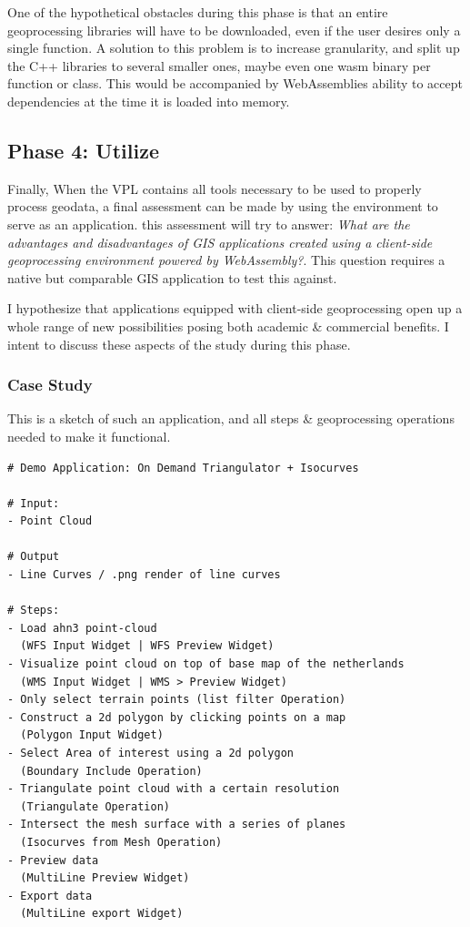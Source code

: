 One of the hypothetical obstacles during this phase is that an entire geoprocessing libraries will have to be downloaded, even if the user desires only a single function. A solution to this problem is to increase granularity, and split up the C++ libraries to several smaller ones, maybe even one wasm binary per function or class. This would be accompanied by WebAssemblies ability to accept dependencies at the time it is loaded into memory. 




\subsection{Phase 4: Utilize}

Finally, When the VPL contains all tools necessary to be used to properly process geodata, a final assessment can be made by using the environment to serve as an application. this assessment will try to answer: \textit{What are the advantages and disadvantages of GIS applications created using a client-side geoprocessing environment powered by WebAssembly?}. This question requires a native but comparable GIS application to test this against.  


I hypothesize that applications equipped with client-side geoprocessing open up a whole range of new possibilities posing both academic \& commercial benefits. 
I intent to discuss these aspects of the study during this phase. 




\subsubsection*{Case Study}

This is a sketch of such an application, and all steps \& geoprocessing operations needed to make it functional.

\begin{lstlisting}
# Demo Application: On Demand Triangulator + Isocurves

# Input: 
- Point Cloud

# Output
- Line Curves / .png render of line curves

# Steps: 
- Load ahn3 point-cloud 
  (WFS Input Widget | WFS Preview Widget)
- Visualize point cloud on top of base map of the netherlands 
  (WMS Input Widget | WMS > Preview Widget)
- Only select terrain points (list filter Operation)
- Construct a 2d polygon by clicking points on a map 
  (Polygon Input Widget)
- Select Area of interest using a 2d polygon 
  (Boundary Include Operation)
- Triangulate point cloud with a certain resolution 
  (Triangulate Operation)
- Intersect the mesh surface with a series of planes 
  (Isocurves from Mesh Operation)
- Preview data 
  (MultiLine Preview Widget)
- Export data 
  (MultiLine export Widget)
\end{lstlisting}
